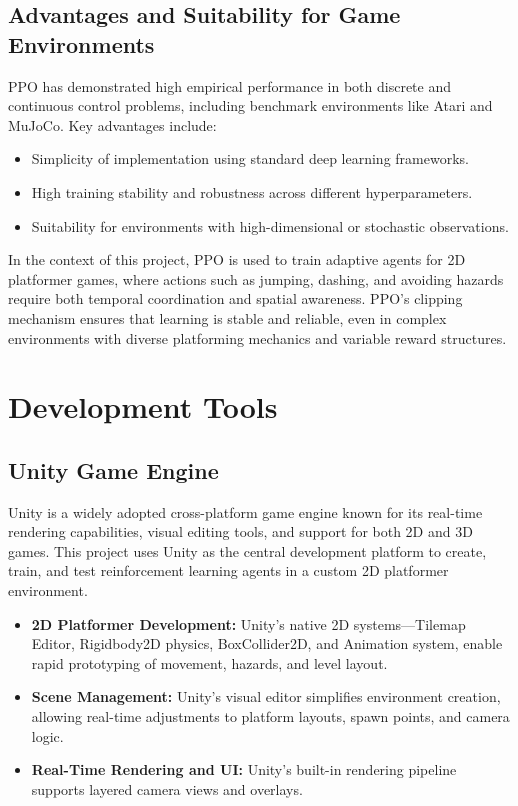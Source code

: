 \documentclass[12pt,oneside,openright,a4paper]{cpe-english-project}
\begin{document}
\subsection{Advantages and Suitability for Game Environments}

PPO has demonstrated high empirical performance in both discrete and continuous control problems, including benchmark environments like Atari and MuJoCo. Key advantages include:
\begin{itemize}
\item Simplicity of implementation using standard deep learning frameworks.
\item High training stability and robustness across different hyperparameters.
\item Suitability for environments with high-dimensional or stochastic observations.
\end{itemize}

In the context of this project, PPO is used to train adaptive agents for 2D platformer games, where actions such as jumping, dashing, and avoiding hazards require both temporal coordination and spatial awareness. PPO’s clipping mechanism ensures that learning is stable and reliable, even in complex environments with diverse platforming mechanics and variable reward structures.

\section{Development Tools}

\subsection{Unity Game Engine}
Unity is a widely adopted cross-platform game engine known for its real-time rendering capabilities, visual editing tools, and support for both 2D and 3D games. This project uses Unity as the central development platform to create, train, and test reinforcement learning agents in a custom 2D platformer environment.

\begin{itemize}
\item \textbf{2D Platformer Development:} Unity’s native 2D systems—Tilemap Editor, Rigidbody2D physics, BoxCollider2D, and Animation system, enable rapid prototyping of movement, hazards, and level layout.
\item \textbf{Scene Management:} Unity's visual editor simplifies environment creation, allowing real-time adjustments to platform layouts, spawn points, and camera logic.
\item \textbf{Real-Time Rendering and UI:} Unity's built-in rendering pipeline supports layered camera views and overlays.
\end{itemize}
\end{document}
